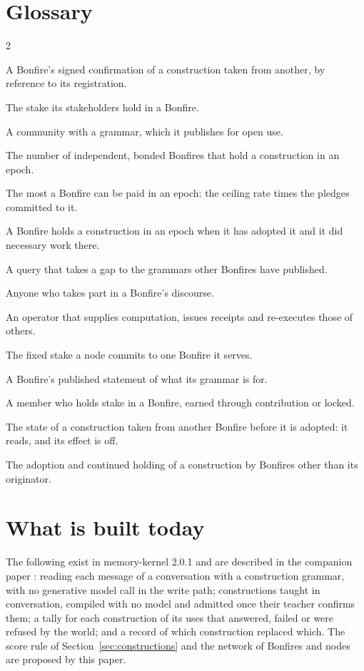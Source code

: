 \section{Glossary}\label{app:glossary}

{\footnotesize\begin{multicols}{2}\begin{description}[leftmargin=1.9cm, style=nextline, itemsep=-1pt, topsep=0pt]
  \item[Adoption] A Bonfire's signed confirmation of a construction taken from another, by reference to its registration.
  \item[Bond] The stake its stakeholders hold in a Bonfire.
  \item[Bonfire] A community with a grammar, which it publishes for open use.
  \item[Breadth] The number of independent, bonded Bonfires that hold a construction in an epoch.
  \item[Ceiling] The most a Bonfire can be paid in an epoch: the ceiling rate times the pledges committed to it.
  \item[Holds] A Bonfire holds a construction in an epoch when it has adopted it and it did necessary work there.
  \item[Lookup] A query that takes a gap to the grammars other Bonfires have published.
  \item[Member] Anyone who takes part in a Bonfire's discourse.
  \item[Node] An operator that supplies computation, issues receipts and re-executes those of others.
  \item[Pledge] The fixed stake a node commits to one Bonfire it serves.
  \item[Signal] A Bonfire's published statement of what its grammar is for.
  \item[Stakeholder] A member who holds stake in a Bonfire, earned through contribution or locked.
  \item[Trial] The state of a construction taken from another Bonfire before it is adopted: it reads, and its effect is off.
  \item[Uptake] The adoption and continued holding of a construction by Bonfires other than its originator.
\end{description}\end{multicols}}

\section{What is built today}\label{app:built}

The following exist in memory-kernel 2.0.1 \citep{memorykernel2026} and are described in the companion paper
\citep{vera2026constructions}: reading each message of a conversation with a construction grammar, with no
generative model call in the write path; constructions taught in conversation, compiled with no model and admitted
once their teacher confirms them; a tally for each construction of its uses that answered, failed or were refused
by the world; and a record of which construction replaced which. The score rule of
Section~\ref{sec:constructions} and the network of Bonfires and nodes are proposed by this paper.

